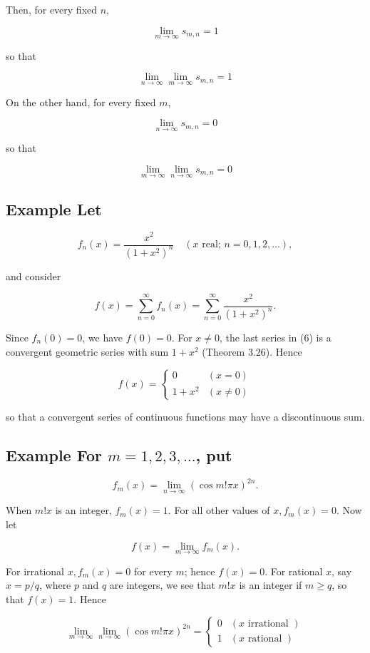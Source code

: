 \documentclass[10pt]{article}
\begin{document}
Then, for every fixed $n$,

$$
\lim _{m \rightarrow \infty} s_{m, n}=1
$$

so that

$$
\lim _{n \rightarrow \infty} \lim _{m \rightarrow \infty} s_{m, n}=1
$$

On the other hand, for every fixed $m$,

$$
\lim _{n \rightarrow \infty} s_{m, n}=0
$$

so that

$$
\lim _{m \rightarrow \infty} \lim _{n \rightarrow \infty} s_{m, n}=0
$$

\subsection{Example Let}
$$
f_{n}(x)=\frac{x^{2}}{\left(1+x^{2}\right)^{n}} \quad(x \text { real; } n=0,1,2, \ldots),
$$

and consider

$$
f(x)=\sum_{n=0}^{\infty} f_{n}(x)=\sum_{n=0}^{\infty} \frac{x^{2}}{\left(1+x^{2}\right)^{n}} .
$$

Since $f_{n}(0)=0$, we have $f(0)=0$. For $x \neq 0$, the last series in (6) is a convergent geometric series with sum $1+x^{2}$ (Theorem 3.26). Hence

$$
f(x)= \begin{cases}0 & (x=0) \\ 1+x^{2} & (x \neq 0)\end{cases}
$$

so that a convergent series of continuous functions may have a discontinuous sum.

\subsection{Example For $m=1,2,3, \ldots$, put}
$$
f_{m}(x)=\lim _{n \rightarrow \infty}(\cos m ! \pi x)^{2 n} .
$$

When $m ! x$ is an integer, $f_{m}(x)=1$. For all other values of $x, f_{m}(x)=0$. Now let

$$
f(x)=\lim _{m \rightarrow \infty} f_{m}(x) .
$$

For irrational $x, f_{m}(x)=0$ for every $m$; hence $f(x)=0$. For rational $x$, say $x=p / q$, where $p$ and $q$ are integers, we see that $m ! x$ is an integer if $m \geq q$, so that $f(x)=1$. Hence

$$
\lim _{m \rightarrow \infty} \lim _{n \rightarrow \infty}(\cos m ! \pi x)^{2 n}= \begin{cases}0 & (x \text { irrational }) \\ 1 & (x \text { rational })\end{cases}
$$
\end{document}
